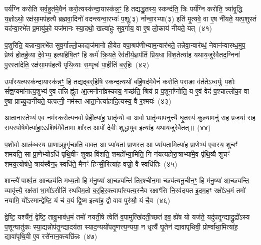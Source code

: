 {\anuvakamend[{आ॒घा॒रं प॑द्यन्ते॒ द्वाद॑शा॒त्मन्ने॒व य॒ज्ञस्य॒ मेध्य॑मे॒व खलु॒ वा अ॒ष्टाद॑श च}]}

पर्य॑ग्नि करोति सर्व॒हुत॑मे॒वैनं॑ करो॒त्यस्क॑न्दा॒यास्क॑न्न॒ꣳ॒ हि तद्यद्धु॒तस्य॒ स्कन्द॑ति॒ त्रिः पर्य॑ग्नि करोति॒ त्र्या॑वृ॒द्धि य॒ज्ञो\-ऽथो॒ रक्ष॑सा॒मप॑हत्यै ब्रह्मवा॒दिनो॑ वदन्त्यन्वा॒रभ्यः॑ प॒शू(३) र्नान्वा॒रभ्या(३) इति॑ मृ॒त्यवे॒ वा ए॒ष नी॑यते॒ यत्प॒शुस्तं यद॑न्वा॒रभे॑त प्र॒मायु॑को॒ यज॑मानः स्या॒दथो॒ खल्वा॑हुः सुव॒र्गाय॒ वा ए॒ष लो॒काय॑ नीयते॒ यत्~(४१)\ip

प॒शुरिति॒ यन्नान्वा॒रभे॑त सुव॒र्गाल्लो॒काद्यज॑मानो हीयेत वपा॒श्रप॑णीभ्याम॒न्वार॑भते॒ तन्नेवा॒न्वार॑ब्धं॒ नेवान॑न्वारब्ध॒मुप॒ प्रेष्य॑ होतर्\mbox{}ह॒व्या दे॒वेभ्य॒ इत्या॑हेषि॒तꣳ हि कर्म॑ क्रि॒यते॒ रेव॑तीर्य॒ज्ञप॑तिं प्रिय॒धा वि॑श॒तेत्या॑ह यथाय॒जुरे॒वैतद॒ग्निना॑ पु॒रस्ता॑देति॒ रक्ष॑सा॒मप॑हत्यै पृथि॒व्याः स॒म्पृचः॑ पा॒हीति॑ ब॒र्॒\mbox{}हिः~(४२)\ip

उपा᳚स्य॒त्यस्क॑न्दा॒यास्क॑न्न॒ꣳ॒ हि तद्यद्ब॒र्॒\mbox{}हिषि॒ स्कन्द॒त्यथो॑ बर्\mbox{}हि॒षद॑मे॒वैनं॑ करोति॒ परा॒ङा व॑र्तते\-ऽध्व॒र्युः प॒शोः सं᳚ज्ञ॒प्यमा॑नात्प॒शुभ्य॑ ए॒व तन्नि ह्नु॑त आ॒त्मनोना᳚व्रस्काय॒ गच्छ॑ति॒ श्रियं प्र प॒शूना᳚प्नोति॒ य ए॒वं वेद॑ प॒श्चाल्लो॑का॒ वा ए॒षा प्राच्यु॒दानी॑यते॒ यत्पत्नी॒ नम॑स्त आता॒नेत्या॑हादि॒त्यस्य॒ वै र॒श्मयः॑~(४३)\ip

आ॒ता॒नास्तेभ्य॑ ए॒व नम॑स्करोत्यन॒र्वा प्रेहीत्या॑ह॒ भ्रातृ॑व्यो॒ वा अर्वा॒ भ्रातृ॑व्यापनुत्त्यै घृ॒तस्य॑ कु॒ल्यामनु॑ स॒ह प्र॒जया॑ स॒ह रा॒यस्पोषे॒णेत्या॑हा॒\-ऽऽ\-शिष॑मे॒वैतामा शा᳚स्त॒ आपो॑ देवीः शुद्धायुव॒ इत्या॑ह यथाय॒जुरे॒वैतत्॥~(४४)\ip

{\anuvakamend[{लो॒काय॑ नीयते॒ यद्ब॒र्॒\mbox{}ही र॒श्मयः॑ स॒प्तत्रिꣳ॑शच्च}]}

प॒शोर्वा आल॑ब्धस्य प्रा॒णाञ्छुगृ॑च्छति॒ वाक्त॒ आ प्या॑यतां प्रा॒णस्त॒ आ प्या॑यता॒मित्या॑ह प्रा॒णेभ्य॑ ए॒वास्य॒ शुचꣳ॑ शमयति॒ सा प्रा॒णेभ्यो\-ऽधि॑ पृथि॒वीꣳ शुक्प्र वि॑शति॒ शमहो᳚भ्या॒मिति॒ नि न॑यत्यहोरा॒त्राभ्या॑मे॒व पृ॑थि॒व्यै शुचꣳ॑ शमय॒त्योष॑धे॒ त्राय॑स्वैन॒ꣴ॒ स्वधि॑ते॒ मैनꣳ॑ हिꣳसी॒रित्या॑ह॒ वज्रो॒ वै स्वधि॑तिः~(४५)\ip

शान्त्यै॑ पार्श्व॒त आच्छ्य॑ति मध्य॒तो हि म॑नु॒ष्या॑ आ॒च्छ्यन्ति॑ तिर॒श्चीन॒मा च्छ्य॑त्यनू॒चीन॒ꣳ॒ हि म॑नु॒ष्या॑ आ॒च्छ्यन्ति॒ व्यावृ॑त्त्यै॒ रक्ष॑सां भा॒गो॑\-ऽसीति॑ स्थविम॒तो ब॒र्॒\mbox{}हिर॒क्त्वापा᳚स्यत्य॒स्नैव रक्षाꣳ॑सि नि॒रव॑दयत इ॒दम॒हꣳ रक्षो॑\-ऽध॒मं तमो॑ नयामि॒ यो᳚\-ऽस्मान्द्वेष्टि॒ यं च॑ व॒यं द्वि॒ष्म इत्या॑ह॒ द्वौ वाव पुरु॑षौ॒ यं चै॒व~(४६)\ip

द्वे॒ष्टि॒ यश्चै॑नं॒ द्वेष्टि॒ तावु॒भाव॑ध॒मं तमो॑ नयती॒षे त्वेति॑ व॒पामुत्खि॑दती॒च्छत॑ इव॒ ह्ये॑ष यो यज॑ते॒ यदु॑पतृ॒न्द्याद्रु॒द्रो᳚\-ऽस्य प॒शून्घातु॑कः स्या॒द्यन्नोप॑तृ॒न्द्यादय॑ता स्याद॒न्ययो॑पतृ॒णत्त्य॒न्यया॒ न धृत्यै॑ घृ॒तेन॑ द्यावा\-पृथिवी॒ प्रोर्ण्वा॑था॒मित्या॑ह॒ द्यावा॑\-पृथि॒वी ए॒व रसे॑नान॒क्त्यछि॑न्नः~(४७)\ip

